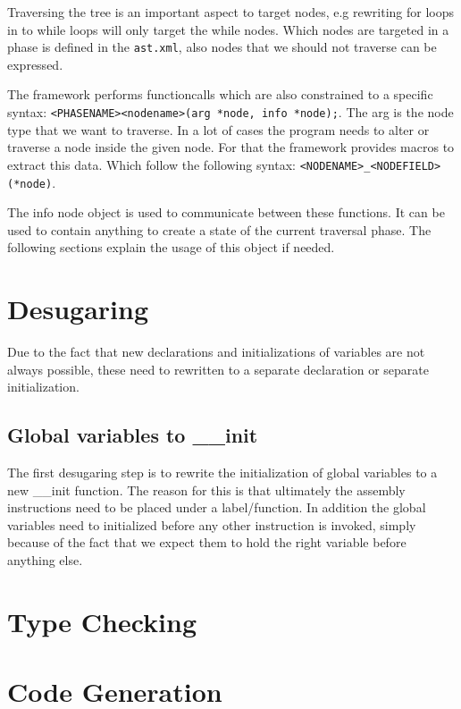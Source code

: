\documentclass[a4paper]{article}
\begin{document}
Traversing the tree is an important aspect to target nodes, e.g rewriting for
loops in to while loops will only target the while nodes. Which nodes are
targeted in a phase is defined in the \texttt{ast.xml}, also nodes that we
should not traverse can be expressed.

The framework performs functioncalls which are also constrained to a specific
syntax: \texttt{<PHASENAME><nodename>(arg *node, info *node);}. The arg is the
node type that we want to traverse. In a lot of cases the program needs to
alter or traverse a node inside the given node. For that the framework provides
macros to extract this data. Which follow the following syntax:
\texttt{<NODENAME>\_<NODEFIELD>(*node)}.

The info node object is used to communicate between these functions. It can be
used to contain anything to create a state of the current traversal phase. The
following sections explain the usage of this object if needed.

\section{Desugaring}
Due to the fact that new declarations and initializations of variables are not
always possible, these need to rewritten to a separate declaration or separate
initialization.

\subsection{Global variables to \_\_init}
The first desugaring step is to rewrite the initialization of global variables
to a new \_\_init function. The reason for this is that ultimately the assembly
instructions need to be placed under a label/function. In addition the global
variables need to initialized before any other instruction is invoked, simply
because of the fact that we expect them to hold the right variable before
anything else.



\section{Type Checking}

\section{Code Generation}

\printindex
\end{document}
